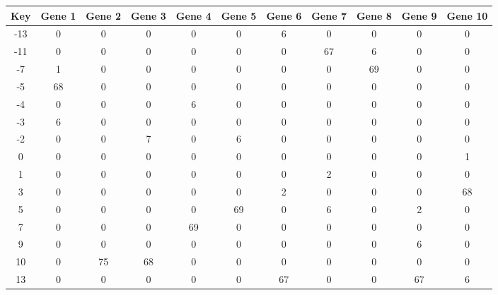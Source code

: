 \begin{tabular}{|c|c|c|c|c|c|c|c|c|c|c|}
\hline
Key & Gene 1 & Gene 2 & Gene 3 & Gene 4 & Gene 5 & Gene 6 & Gene 7 & Gene 8 & Gene 9 & Gene 10 \\
\hline
-13 & 0 & 0 & 0 & 0 & 0 & 6 & 0 & 0 & 0 & 0 \\
-11 & 0 & 0 & 0 & 0 & 0 & 0 & 67 & 6 & 0 & 0 \\
-7 & 1 & 0 & 0 & 0 & 0 & 0 & 0 & 69 & 0 & 0 \\
-5 & 68 & 0 & 0 & 0 & 0 & 0 & 0 & 0 & 0 & 0 \\
-4 & 0 & 0 & 0 & 6 & 0 & 0 & 0 & 0 & 0 & 0 \\
-3 & 6 & 0 & 0 & 0 & 0 & 0 & 0 & 0 & 0 & 0 \\
-2 & 0 & 0 & 7 & 0 & 6 & 0 & 0 & 0 & 0 & 0 \\
0 & 0 & 0 & 0 & 0 & 0 & 0 & 0 & 0 & 0 & 1 \\
1 & 0 & 0 & 0 & 0 & 0 & 0 & 2 & 0 & 0 & 0 \\
3 & 0 & 0 & 0 & 0 & 0 & 2 & 0 & 0 & 0 & 68 \\
5 & 0 & 0 & 0 & 0 & 69 & 0 & 6 & 0 & 2 & 0 \\
7 & 0 & 0 & 0 & 69 & 0 & 0 & 0 & 0 & 0 & 0 \\
9 & 0 & 0 & 0 & 0 & 0 & 0 & 0 & 0 & 6 & 0 \\
10 & 0 & 75 & 68 & 0 & 0 & 0 & 0 & 0 & 0 & 0 \\
13 & 0 & 0 & 0 & 0 & 0 & 67 & 0 & 0 & 67 & 6 \\
\hline
\end{tabular}